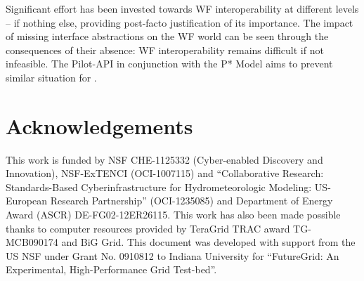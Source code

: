 \documentclass{sig-alternate}
\begin{document}

Significant effort has been invested towards WF interoperability at
different levels -- if nothing else, providing post-facto
justification of its importance. The impact of missing interface
abstractions on the WF world can be seen through the consequences of
their absence: WF interoperability remains difficult if not
infeasible. The Pilot-API in conjunction with the P* Model aims to
prevent similar situation for \pilotjobs.







\section*{Acknowledgements}
\footnotesize{This work is funded by NSF CHE-1125332 (Cyber-enabled
  Discovery and Innovation), NSF-ExTENCI (OCI-1007115) and
  ``Collaborative Research: Standards-Based Cyberinfrastructure for
  Hydrometeorologic Modeling: US-European Research Partnership''
  (OCI-1235085) and Department of Energy Award (ASCR)
  DE-FG02-12ER26115.  This work has also been made possible thanks to
  computer resources provided by TeraGrid TRAC award TG-MCB090174 and
  BiG Grid.  This document was developed with support from the US NSF
  under Grant No. 0910812 to Indiana University for ``FutureGrid: An
  Experimental, High-Performance Grid Test-bed''.}

% 


\end{document}
